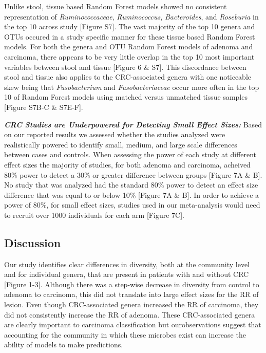 \documentclass[12pt,]{article}
\begin{document}
Unlike stool, tissue based Random Forest models showed no consistent
representation of \emph{Ruminococcaceae}, \emph{Ruminococcus},
\emph{Bacteroides}, and \emph{Roseburia} in the top 10 across study
{[}Figure S7{]}. The vast majority of the top 10 genera and OTUs occured
in a study specific manner for these tissue based Random Forest models.
For both the genera and OTU Random Forest models of adenoma and
carcinoma, there appears to be very little overlap in the top 10 most
important variables between stool and tissue {[}Figure 6 \& S7{]}. This
discordance between stool and tissue also applies to the CRC-associated
genera with one noticeable skew being that \emph{Fusobacterium} and
\emph{Fusobacteriaceae} occur more often in the top 10 of Random Forest
models using matched versus unmatched tissue samples {[}Figure S7B-C \&
S7E-F{]}.

\textbf{\emph{CRC Studies are Underpowered for Detecting Small Effect
Sizes:}} Based on our reported results we assessed whether the studies
analyzed were realistically powered to identify small, medium, and large
scale differences between cases and controls. When assessing the power
of each study at different effect sizes the majority of studies, for
both adenoma and carcinoma, acheived 80\% power to detect a 30\% or
greater difference between groups {[}Figure 7A \& B{]}. No study that
was analyzed had the standard 80\% power to detect an effect size
difference that was equal to or below 10\% {[}Figure 7A \& B{]}. In
order to achieve a power of 80\%, for small effect sizes, studies used
in our meta-analysis would need to recruit over 1000 individuals for
each arm {[}Figure 7C{]}.

\newpage

\subsection{Discussion}\label{discussion}

Our study identifies clear differences in diversity, both at the
community level and for individual genera, that are present in patients
with and without CRC {[}Figure 1-3{]}. Although there was a step-wise
decrease in diversity from control to adenoma to carcinoma, this did not
translate into large effect sizes for the RR of lesion. Even though
CRC-associated genera increased the RR of carcinoma, they did not
consistently increase the RR of adenoma. These CRC-associated genera are
clearly important to carcinoma classification but ourobservations
suggest that accounting for the community in which these microbes exist
can increase the ability of models to make predictions.
\end{document}

